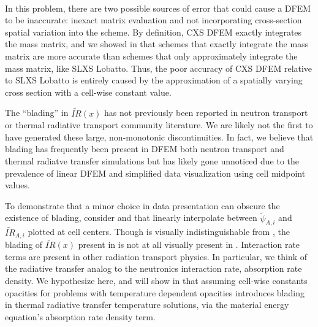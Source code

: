 %
%
\\
In this problem, there are two possible sources of error that could cause a DFEM to be inaccurate: inexact matrix evaluation and not incorporating cross-section spatial variation into the scheme.
By definition, CXS DFEM exactly integrates the mass matrix, and we showed in  that schemes that exactly integrate the mass matrix are more accurate than schemes that only approximately integrate the mass matrix, like SLXS Lobatto.
Thus, the poor accuracy of CXS DFEM relative to SLXS Lobatto is entirely caused by the approximation of a spatially varying cross section with a cell-wise constant value.

The ``blading'' in $\widetilde{IR}(x)$ has not previously been reported in neutron transport or thermal radiative transport community literature.
We are likely not the first to have generated these large, non-monotonic discontinuities. 
In fact, we believe that blading has frequently been present in DFEM both neutron transport and thermal radiatve transfer simulations but has likely gone unnoticed due to the prevalence of linear DFEM and simplified data visualization using cell midpoint values.

To demonstrate that a minor choice in data presentation can obscure the existence of blading, consider  and  that linearly interpolate between $\widetilde{\psi}_{A,i}$ and  $\widetilde{IR}_{A,i}$ plotted at cell centers.
Though  is visually indistinguishable from , the blading of $\widetilde{IR}(x)$ present in  is not at all visually present in .
Interaction rate terms are present in other radiation transport physics.
In particular, we think of the radiative transfer analog to the neutronics interaction rate, absorption rate density.
We hypothesize here, and will show in  that assuming cell-wise constants opacities for problems with temperature dependent opacities introduces blading in thermal radiative transfer temperature solutions, via the material energy equation's absorption rate density term.
\vfill{}

